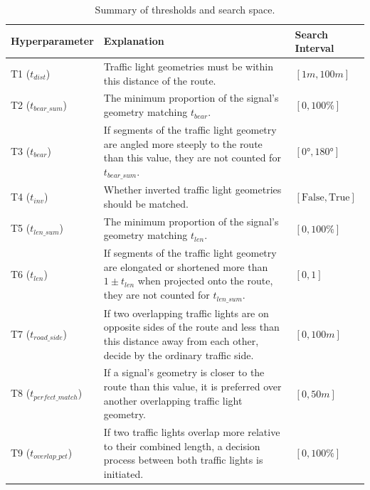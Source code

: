 \begin{table}[!b]
\caption{Summary of thresholds and search space.}
\begin{tabular}{@{}lp{8cm}l@{}}
\toprule
\textbf{Hyperparameter}  & \textbf{Explanation} & \textbf{Search Interval} \\
\midrule
T1 ($t_{dist}$) & Traffic light geometries must be within this distance of the route. & $[1m, 100m]$ \\
T2 ($t_{bear\_sum}$) & The minimum proportion of the signal's geometry matching $t_{bear}$. & $[0, 100\%]$ \\
T3 ($t_{bear}$) & If segments of the traffic light geometry are angled more steeply to the route than this value, they are not counted for $t_{bear\_sum}$. & $[0°, 180°]$ \\
T4 ($t_{inv}$) & Whether inverted traffic light geometries should be matched. & $[\text{False}, \text{True}]$ \\
T5 ($t_{len\_sum}$) & The minimum proportion of the signal's geometry matching $t_{len}$. & $[0, 100\%]$ \\
T6 ($t_{len}$) & If segments of the traffic light geometry are elongated or shortened more than $1 \pm t_{len}$ when projected onto the route, they are not counted for $t_{len\_sum}$. & $[0, 1]$\\
T7 ($t_{road\_side}$) & If two overlapping traffic lights are on opposite sides of the route and less than this distance away from each other, decide by the ordinary traffic side. & $[0, 100m]$ \\
T8 ($t_{perfect\_match}$) & If a signal's geometry is closer to the route than this value, it is preferred over another overlapping traffic light geometry. & $[0, 50m]$ \\
T9 ($t_{overlap\_pct}$) & If two traffic lights overlap more relative to their combined length, a decision process between both traffic lights is initiated. & $[0, 100\%]$ \\
\bottomrule
\end{tabular}
\label{tab:hyperparameter-space}
\end{table}

